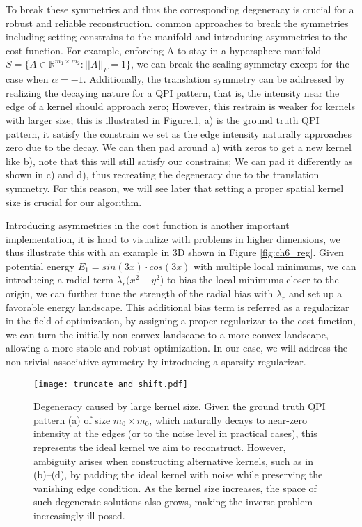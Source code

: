 To break these symmetries and thus the corresponding degeneracy is crucial for a robust and reliable reconstruction. common approaches to break the symmetries including setting constrains to the manifold and introducing asymmetries to the cost function. For example,  enforcing A to stay in a hypersphere manifold $S = \{A \in \mathbb{R}^{m_1 \times m_2}: \vert\vert A \vert \vert_{F}= 1\}$, we can break the scaling symmetry except for the case when $\alpha = -1$. Additionally, the translation symmetry can be addressed by realizing the decaying nature for a QPI pattern, that is, the intensity near the edge of a kernel should approach zero; However, this restrain is weaker for kernels with larger size; this is illustrated in Figure.\ref{fig:ch6_t&s}, a) is the ground truth QPI pattern, it satisfy the constrain we set as the edge intensity naturally approaches zero due to the decay. We can then pad around a) with zeros to get a new kernel like b), note that this will still satisfy our constrains; We can pad it differently as shown in c) and d), thus recreating the degeneracy due to the translation symmetry. For this reason, we will see later that setting a proper spatial kernel size is crucial for our algorithm. 

Introducing asymmetries in the cost function is another important implementation, it is hard to visualize with problems in higher dimensions, we thus illustrate this with an example in 3D shown in Figure \ref{fig:ch6_reg}. Given potential energy $E_1 = sin(3x)\cdot cos(3x)$ with multiple local minimums, we can introducing a radial term $\lambda_r(x^2 + y^2$) to bias the local minimums closer to the origin, we can further tune the strength of the radial bias with $\lambda_r$ and set up a favorable energy landscape. This additional bias term is referred as a regularizar in the field of optimization, by assigning a proper regularizar to the cost function, we can turn the initially non-convex landscape to a more convex landscape, allowing a more stable and robust optimization. In our case, we will address the non-trivial associative symmetry by introducing a sparsity regularizar. 

\begin{figure}
	\texttt{[image: truncate and shift.pdf]} 
	\centering
	\caption{Degeneracy caused by large kernel size. Given the ground truth QPI pattern (a) of size $m_0 \times m_0$, which naturally decays to near-zero intensity at the edges (or to the noise level in practical cases), this represents the ideal kernel we aim to reconstruct. However, ambiguity arises when constructing alternative kernels, such as in (b)–(d), by padding the ideal kernel with noise while preserving the vanishing edge condition. As the kernel size increases, the space of such degenerate solutions also grows, making the inverse problem increasingly ill-posed.}
	\label{fig:ch6_t&s}
\end{figure}

